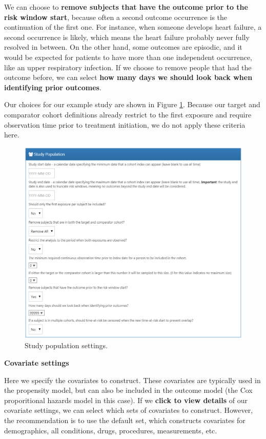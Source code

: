 \documentclass[]{book}
\begin{document}
We can choose to \textbf{remove subjects that have the outcome prior to the risk window start}, because often a second outcome occurrence is the continuation of the first one. For instance, when someone develops heart failure, a second occurrence is likely, which means the heart failure probably never fully resolved in between. On the other hand, some outcomes are episodic, and it would be expected for patients to have more than one independent occurrence, like an upper respiratory infection. If we choose to remove people that had the outcome before, we can select \textbf{how many days we should look back when identifying prior outcomes}.

Our choices for our example study are shown in Figure \ref{fig:studyPopulation}. Because our target and comparator cohort definitions already restrict to the first exposure and require observation time prior to treatment initiation, we do not apply these criteria here.

\begin{figure}

{\centering \includegraphics[width=1\linewidth]{images/PopulationLevelEstimation/studyPopulation} 

}

\caption{Study population settings.}\label{fig:studyPopulation}
\end{figure}

\textbf{Covariate settings}

Here we specify the covariates to construct. These covariates are typically used in the propensity model, but can also be included in the outcome model (the Cox proporitional hazards model in this case). If we \textbf{click to view details} of our covariate settings, we can select which sets of covariates to construct. However, the recommendation is to use the default set, which constructs covariates for demographics, all conditions, drugs, procedures, measurements, etc.
\end{document}
